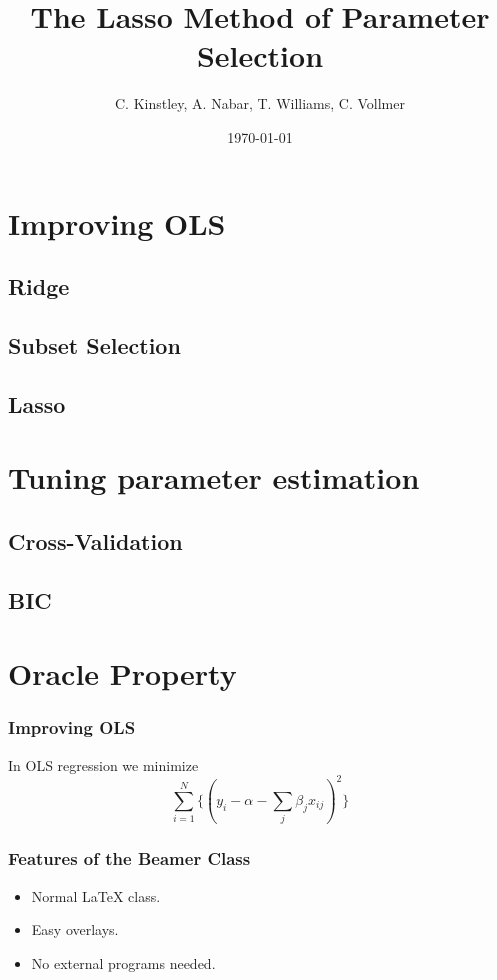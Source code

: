 \documentclass{beamer}
\title{The Lasso Method of Parameter Selection}
\author{C. Kinstley, A. Nabar, T. Williams, C. Vollmer }
\date{\today}
\begin{document}
\frame{\titlepage}

\section[Outline]{}
\frame{\tableofcontents}

\section{Improving OLS}
\subsection{Ridge}
\subsection{Subset Selection}
\subsection{Lasso}

\section{Tuning parameter estimation}
\subsection{Cross-Validation}
\subsection{BIC}

\section{Oracle Property}

\frame
{
\frametitle{Improving OLS}
	In OLS regression we minimize
	\begin{equation*}
\sum_{i=1}^N\{(y_i - \alpha-\sum_j\beta_jx_{ij} )^2 \}
	\end{equation*}

}


\frame
{
  \frametitle{Features of the Beamer Class}

  \begin{itemize}
  \item<1-> Normal LaTeX class.
  \item<2-> Easy overlays.
  \item<3-> No external programs needed.      
  \end{itemize}
}
\end{document}
